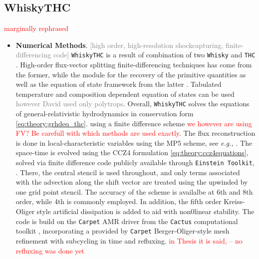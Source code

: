 \documentclass[11pt,a4paper,headinclude=true,DIV=14,BCOR=8mm,chapterprefix,listof=totoc,twoside,openright,abstracton]{scrbook}
\begin{document}
\subsection{WhiskyTHC}
\textcolor{red}{marginally rephrased}
\begin{itemize}
    \item \textbf{Numerical Methods}. \textcolor{gray}{[high order, high-resolution shockcapturing, finite-differencing code]} \texttt{WhiskyTHC} is a result of combination of two \texttt{Whisky} \cite{Baiotti:2004wn} and \texttt{THC} \cite{Radice:2012cu}. High-order flux-vector splitting finite-differencing techniques has come from the former, while the module for the recovery of the primitive quantities as well as the equation of state framework from the latter \cite{Galeazzi:2013mia}. Tabulated temperature and composition dependent equation of states can be used \textcolor{gray}{however David used only polytrops}. Overall, \texttt{WhiskyTHC} solves the equations of general-relativistic hydrodynamics in conservation form \ref{eq:theory:grhdeq_thc}. using a finite difference scheme \textcolor{red}{we however are using FV? Be carefull with which methods are used exactly}. The flux reconstruction is done in
    local-characteristic variables using the MP5 scheme, see \textit{e.g.,} \cite{Rezzolla:2013}. The space-time is evolved using the CCZ4 formulation \ref{eq:theory:ccz4equations}, solved via finite difference code publicly available through \texttt{Einstein Toolkit}, \cite{McLachlan,Loffler:2011ay}. There, the central stencil is used throughout, and only terms associated with the advection along the shift vector are treated using the upwinded by one grid point stencil. The accuracy of the scheme is availalbe at 6th and 8th order, while 4th is commonly employed. In addition, the fifth order Kreiss-Oliger style artificial dissipation \cite{Kreiss:1973} is added to aid with non0linear stability. 
    The code is build on the \texttt{Carpet} AMR driver \cite{Schnetter:2003rb} from the \texttt{Cactus} computational toolkit \cite{Goodale:2003}, incorporating a provided by \texttt{Carpet} Berger-Oliger-style mesh refinement \cite{Berger:1989,Berger:1984} with subcycling in time and refluxing. \textcolor{red}{in Thesis it is said, -- no refluxing was done yet}
    

\end{itemize}
\end{document}
